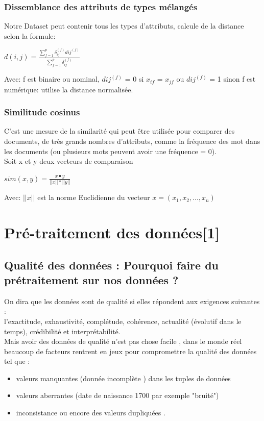 \documentclass[12pt,a4paper,oneside]{book}
\begin{document}
\subsection{Dissemblance des attributs de types mélangés}
Notre Dataset peut contenir tous les types d'attributs, calcule de la distance selon la formule:
\begin{center}
	$d(i,j) = \frac{\sum_{f=1}^{p}{\delta_{ij}^{(f)} d{ij}^{(f)}}}{\sum_{f=1}^{p}{\delta_{ij}^{(f)}}}$
\end{center}
Avec: f est binaire ou nominal,
$d{ij}^{(f)}$ = 0 si $x_{if}$ = $x_{jf}$ ou $d{ij}^{(f)}$ = 1 sinon
f est numérique: utilise la distance normalisée.
\subsection{Similitude cosinus}
C'est une mesure de la similarité qui peut être utilisée pour comparer des documents, de très grands nombres d'attributs, comme la fréquence des mot dans les documents (ou plusieurs mots peuvent avoir une fréquence = 0).\\
Soit x et y deux vecteurs de comparaison
\begin{center}
	$sim(x,y) = \frac{x\bullet y}{||x||*||y||}$
\end{center}
Avec: $||x||$ est la norme Euclidienne du vecteur $x = (x_{1}, x_{2}, ... , x_{n})$

\chapter{Pré-traitement des données[1]}
\vspace{-1 cm}

\section{Qualité des données : Pourquoi faire du prétraitement sur nos données ?}
On dira que les données sont de qualité si elles répondent aux exigences suivantes :\\
l'exactitude, exhaustivité, complétude,  cohérence, actualité (évolutif dans le temps), crédibilité et interprétabilité.\\
	
Mais avoir des données de qualité n'est pas chose facile , dans le monde réel beaucoup de facteurs rentrent en jeux pour compromettre  la qualité des données tel que :
\begin{itemize}
	\item  valeurs manquantes (donnée incomplète ) dans les tuples de données 
	\item  valeurs aberrantes (date de naissance 1700 par exemple "bruité") 
	\item inconsistance ou encore des valeurs dupliquées . 
	
\end{itemize} 
\end{document}
